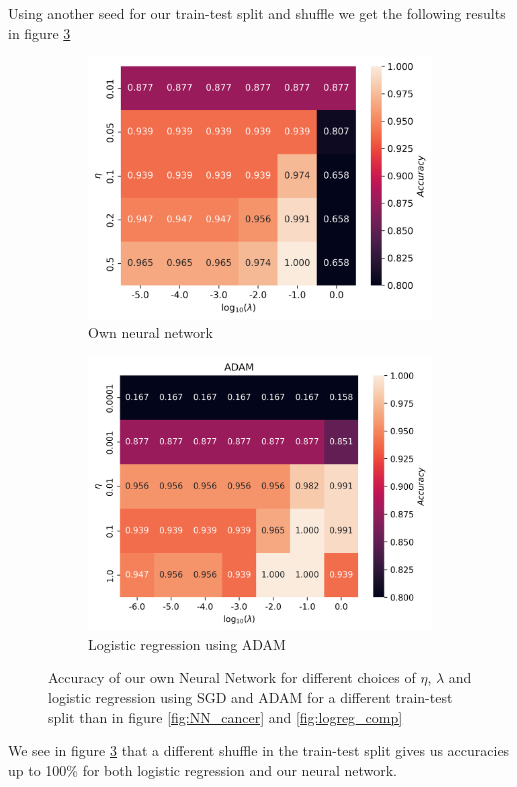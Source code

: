 \documentclass[11pt]{article}
\begin{document}
Using another seed for our train-test split and shuffle we get the following results in figure \ref{fig:cancer_best}
\begin{figure}[H]
    \begin{subfigure}{.5\textwidth}
        \centering
        \includegraphics[width=\textwidth]{../figures/cancer_eta_lmb_best.png}
        \caption{Own neural network}
        \label{fig:}
    \end{subfigure}
    \begin{subfigure}{.5\textwidth}
        \centering
        \includegraphics[width=\textwidth]{../figures/logreg_ADAM_best.png}
        \caption{Logistic regression using ADAM}
        \label{fig:}
    \end{subfigure}
    \caption{Accuracy of our own Neural Network for different choices of $\eta$, $\lambda$ and logistic regression using SGD and ADAM for a different train-test split than in figure \ref{fig:NN_cancer} and \ref{fig:logreg_comp}}
    \label{fig:cancer_best}
\end{figure}
We see in figure \ref{fig:cancer_best} that a different shuffle in the train-test split gives us accuracies up to 100\% for both logistic regression and our neural network.
\end{document}
